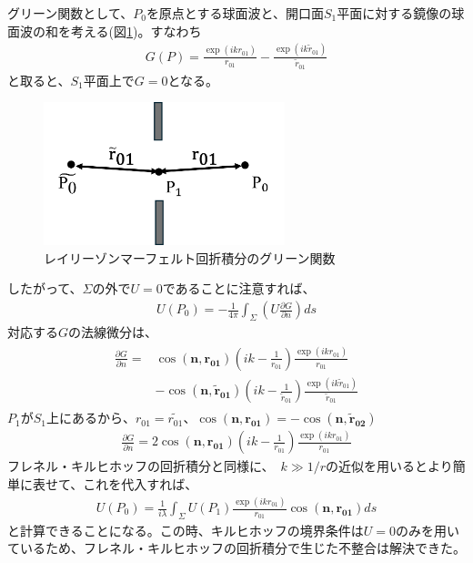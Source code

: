 \documentclass[a4paper,11pt,uplatex]{jsbook}
\begin{document}
グリーン関数として、$P_0$を原点とする球面波と、開口面$S_1$平面に対する鏡像の球面波の和を考える(図\ref{fig:diff_ray})。すなわち
\begin{eqnarray}
  G(P) = \frac{\exp(ikr_{01})}{r_{01}} -\frac{\exp(ik\tilde{r}_{01})}{\tilde{r}_{01}}
\end{eqnarray}
と取ると、$S_1$平面上で$G =0$となる。
\begin{figure}[H]
  \centering
  \includegraphics[width=7cm]{image/2-diffraction_ray.png}
  \caption[レイリーゾンマーフェルト積分の座標系]{レイリーゾンマーフェルト回折積分のグリーン関数}\label{fig:diff_ray}
\end{figure}
したがって、$\Sigma$の外で$U =0 $であることに注意すれば、
\begin{eqnarray}
  U(P_0) = -\frac{1}{4\pi}\int_{\Sigma} \left( U\frac{\partial G}{\partial n} \right) ds
\end{eqnarray}
対応する$G$の法線微分は、
\begin{eqnarray}
  \begin{split}
  \frac{\partial G}{\partial n} = &\cos(\bm{n},\bm{r_{01}})\left(ik - \frac{1}{r_{01}}\right)\frac{\exp(ikr_{01})}{r_{01}} \\
  &- \cos(\bm{n},\bm{\tilde{r}_{01}})\left(ik - \frac{1}{\tilde{r}_{01}}\right)\frac{\exp(ik\tilde{r}_{01})}{\tilde{r}_{01}}
  \end{split}
\end{eqnarray}
$P_1$が$S_1$上にあるから、$r_{01} = \tilde{r_{01}}$、$\cos(\bm{n},\bm{r_{01}}) = -\cos(\bm{n},\bm{\tilde{r}_{02}})$
\begin{eqnarray}
  \frac{\partial G}{\partial n} = 2\cos(\bm{n},\bm{r_{01}})\left(ik - \frac{1}{r_{01}}\right)\frac{\exp(ikr_{01})}{r_{01}}
\end{eqnarray}
フレネル・キルヒホッフの回折積分と同様に、~$k \gg 1/r$の近似を用いるとより簡単に表せて、これを代入すれば、
\begin{eqnarray}
  U(P_0) = \frac{1}{i\lambda}\int_{\Sigma} U(P_1)\frac{\exp(ikr_{01})}{r_{01}}\cos(\bm{n},\bm{r_{01}})ds
\end{eqnarray}
と計算できることになる。この時、キルヒホッフの境界条件は$U=0$のみを用いているため、フレネル・キルヒホッフの回折積分で生じた不整合は解決できた。
\end{document}
